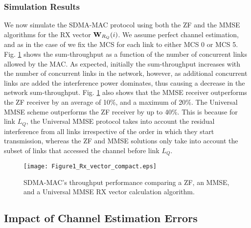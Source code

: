 \documentclass[journal, final]{IEEEtran}
\begin{document}
\subsubsection{Simulation Results}

We now simulate the SDMA-MAC protocol using both the ZF and the MMSE
algorithms for the RX vector ${\rm {\bf W}}_{R_Q } (i)$. We assume perfect
channel estimation, and as in the case of \cite{1_SPACEMAC, 2_MIMOMAN, 3_NULLHOC} we fix the MCS for each link
to either MCS 0 or MCS 5. Fig. \ref{Fig1_Rx_vector} shows the sum-throughput as a function of
the number of concurrent links allowed by the MAC. As expected, initially
the sum-throughput increases with the number of concurrent links in the
network, however, as additional concurrent links are added the interference
power dominates, thus causing a decrease in the network sum-throughput.
Fig. \ref{Fig1_Rx_vector} also shows that the MMSE receiver outperforms the ZF receiver by an average of 10{\%}, and a maximum of 20{\%}. The Universal MMSE scheme outperforms the ZF receiver by up to 40{\%}. This is because for link $L_Q$, the Universal MMSE protocol takes into account the residual interference from all links irrespective of the order in which they start transmission, whereas the ZF and MMSE solutions only take into account the subset of links that accessed the channel before link $L_Q$.

\begin{figure}
\centering
\texttt{[image: Figure1\_Rx\_vector\_compact.eps]}
\caption{SDMA-MAC's throughput performance comparing a ZF, an MMSE, and a Universal MMSE RX vector calculation algorithm.}
\label{Fig1_Rx_vector}
\end{figure}

\subsection{Impact of Channel Estimation Errors}
\end{document}
